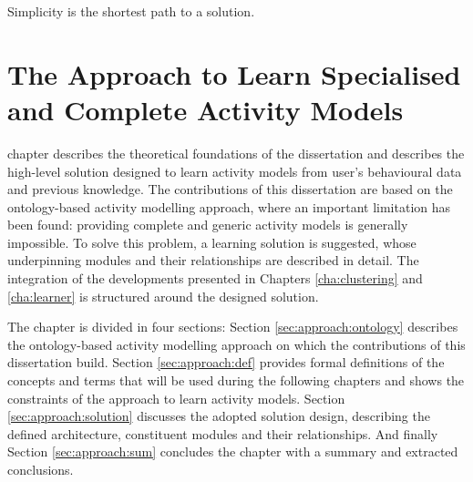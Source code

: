 

\begin{savequote}[50mm]
Simplicity is the shortest path to a solution.
\end{savequote}


\chapter{The Approach to Learn Specialised and Complete Activity Models}
\label{cha:archi}

\ifpdf
    \graphicspath{{3_approach_to_learning_eam/figures/PDF/}{3_approach_to_learning_eam/figures/PNG/}{3_approach_to_learning_eam/figures/}}
\else
    \graphicspath{{3_approach_to_learning_eam/figures/EPS/}{3_approach_to_learning_eam/figures/}}
\fi

 chapter describes the theoretical foundations of the dissertation and describes the high-level solution designed to learn activity models from user's behavioural data and previous knowledge. The contributions of this dissertation are based on the ontology-based activity modelling approach, where an important limitation has been found: providing complete and generic activity models is generally impossible. To solve this problem, a learning solution is suggested, whose underpinning modules and their relationships are described in detail. The integration of the developments presented in Chapters \ref{cha:clustering} and \ref{cha:learner} is structured around the designed solution.


The chapter is divided in four sections: Section \ref{sec:approach:ontology} describes the ontology-based activity modelling approach on which the contributions of this dissertation build. Section \ref{sec:approach:def} provides formal definitions of the concepts and terms that will be used during the following chapters and shows the constraints of the approach to learn activity models. Section \ref{sec:approach:solution} discusses the adopted solution design, describing the defined architecture, constituent modules and their relationships. And finally Section \ref{sec:approach:sum} concludes the chapter with a summary and extracted conclusions.